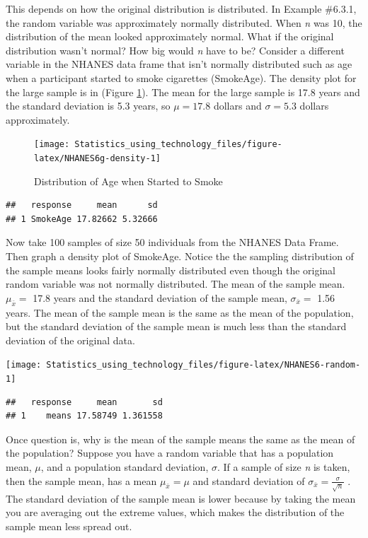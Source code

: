 \documentclass[
]{book}
\begin{document}
This depends on how the original distribution is distributed. In Example \#6.3.1, the random variable was approximately normally distributed. When \emph{n} was 10, the distribution of the mean looked approximately normal. What if the original distribution wasn't normal? How big would \emph{n} have to be? Consider a different variable in the NHANES data frame that isn't normally distributed such as age when a participant started to smoke cigarettes (SmokeAge). The density plot for the large sample is in (Figure \ref{fig:NHANES6g-density}). The mean for the large sample is 17.8 years and the standard deviation is 5.3 years, so \(\mu=17.8\) dollars and \(\sigma=5.3\) dollars approximately.



\begin{figure}
\texttt{[image: Statistics\_using\_technology\_files/figure-latex/NHANES6g-density-1]} \caption{Distribution of Age when Started to Smoke}\label{fig:NHANES6g-density}
\end{figure}

\begin{verbatim}
##   response     mean      sd
## 1 SmokeAge 17.82662 5.32666
\end{verbatim}

Now take 100 samples of size 50 individuals from the NHANES Data Frame. Then graph a density plot of SmokeAge. Notice the the sampling distribution of the sample means looks fairly normally distributed even though the original random variable was not normally distributed. The mean of the sample mean. \(\mu_{ \bar{x}}=\) 17.8 years and the standard deviation of the sample mean, \(\sigma_{\bar{x}}=\) 1.56 years. The mean of the sample mean is the same as the mean of the population, but the standard deviation of the sample mean is much less than the standard deviation of the original data.

\texttt{[image: Statistics\_using\_technology\_files/figure-latex/NHANES6-random-1]}

\begin{verbatim}
##   response     mean       sd
## 1    means 17.58749 1.361558
\end{verbatim}

Once question is, why is the mean of the sample means the same as the mean of the population? Suppose you have a random variable that has a population mean, \(\mu\), and a population standard deviation, \(\sigma\). If a sample of size \emph{n} is taken, then the sample mean, has a mean \(\mu_{ \bar{x}}=\mu\) and standard deviation of \(\sigma_{ \bar{x}}=\frac{\sigma}{\sqrt{n}}\) . The standard deviation of the sample mean is lower because by taking the mean you are averaging out the extreme values, which makes the distribution of the sample mean less spread out.
\end{document}
